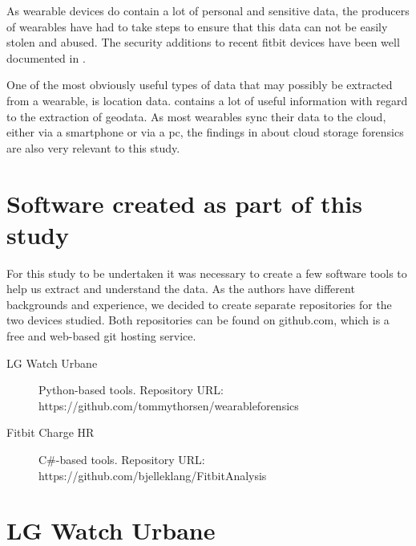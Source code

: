 \documentclass[a4paper,11pt,dvips]{article}
\begin{document}
As wearable devices do contain a lot of personal and sensitive data, the producers of wearables have had to take steps to ensure that this data can not be easily stolen and abused. The security additions to recent fitbit devices have been well documented in \cite{cyr2014security}.

One of the most obviously useful types of data that may possibly be extracted from a wearable, is location data. \cite{maus2011forensic} contains a lot of useful information with regard to the extraction of geodata. As most wearables sync their data to the cloud, either via a smartphone or via a pc, the findings in \cite{chung2012digital} about cloud storage forensics are also very relevant to this study.


\section{Software created as part of this study}
For this study to be undertaken it was necessary to create a few software tools to help us extract and understand the data. As the authors have different backgrounds and experience, we decided to create separate repositories for the two devices studied. Both repositories can be found on github.com, which is a free and web-based git hosting service.

\begin{description}
\item [LG Watch Urbane] Python-based tools. Repository URL:
\newline
https://github.com/tommythorsen/wearableforensics
\item [Fitbit Charge HR] C\#-based tools. Repository URL:
\newline
https://github.com/bjelleklang/FitbitAnalysis	
\end{description}


\section{LG Watch Urbane}
\end{document}
